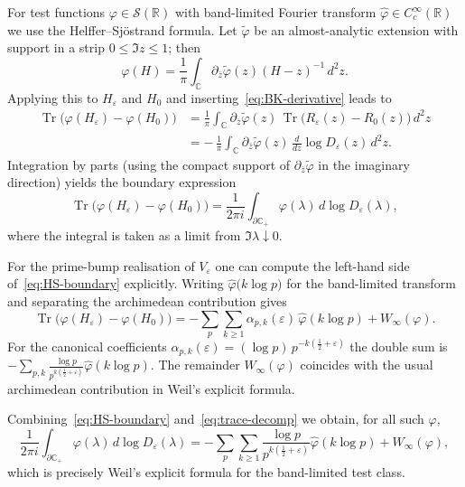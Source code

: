 ﻿\documentclass[12pt,a4paper]{article}
\theoremstyle{definition}
\theoremstyle{remark}
\newcommand{\CC}{\mathbb{C}}
\newcommand{\RR}{\mathbb{R}}
\newcommand{\Tr}{\operatorname{Tr}}
\begin{document}
For test functions $\varphi\in\mathcal{S}(\RR)$ with band-limited Fourier transform $\widehat\varphi\in C_c^\infty(\RR)$ we use the Helffer--Sj\"ostrand formula.  Let $\tilde{\varphi}$ be an almost-analytic extension with support in a strip $0\le\Im z\le1$; then
\begin{equation}
  \varphi(H)=\frac{1}{\pi}\int_{\CC}\partial_{\bar z}\tilde{\varphi}(z)
  (H-z)^{-1}
  \,d^2z.
  \label{eq:HS-formula}
\end{equation}
Applying this to $H_\varepsilon$ and $H_0$ and inserting~\eqref{eq:BK-derivative} leads to
\begin{align}
  \Tr\bigl(\varphi(H_\varepsilon)-\varphi(H_0)\bigr)
  &= \frac{1}{\pi}\int_{\CC} \partial_{\bar z}\tilde{\varphi}(z) \, \Tr\bigl(R_\varepsilon(z)-R_0(z)\bigr)\,d^2z \\[.5em]
  &=-\,\frac{1}{\pi}\int_{\CC} \partial_{\bar z}\tilde{\varphi}(z) \, \frac{d}{dz}\log D_\varepsilon(z)\,d^2z.
  \label{eq:HS-trace}
\end{align}
Integration by parts (using the compact support of $\partial_{\bar z}\tilde{\varphi}$ in the imaginary direction) yields the boundary expression
\begin{equation}
  \Tr\bigl(\varphi(H_\varepsilon)-\varphi(H_0)\bigr)
  = \frac{1}{2\pi i} \int_{\partial\CC_+} \varphi(\lambda)\, d\log D_\varepsilon(\lambda),
  \label{eq:HS-boundary}
\end{equation}
where the integral is taken as a limit from $\Im \lambda\downarrow0$.

For the prime-bump realisation of $V_\varepsilon$ one can compute the left-hand side of~\eqref{eq:HS-boundary} explicitly.  Writing $\widehat\varphi\bigl(k\log p\bigr)$ for the band-limited transform and separating the archimedean contribution gives
\begin{equation}
  \Tr\bigl(\varphi(H_\varepsilon)-\varphi(H_0)\bigr)
  = -\sum_{p}\sum_{k\ge1}\alpha_{p,k}(\varepsilon)\,\widehat\varphi(k\log p) + W_\infty(\varphi).
  \label{eq:trace-decomp}
\end{equation}
For the canonical coefficients $\alpha_{p,k}(\varepsilon)=(\log p)\,p^{-k(\frac12+\varepsilon)}$ the double sum is
\(
  -\sum_{p, k}\frac{\log p}{p^{k(\frac12+\varepsilon)}}\widehat\varphi(k\log p).
\)
The remainder $W_\infty(\varphi)$ coincides with the usual archimedean contribution in Weil's explicit formula.

Combining~\eqref{eq:HS-boundary} and~\eqref{eq:trace-decomp} we obtain, for all such $\varphi$,
\begin{equation}
  \frac{1}{2\pi i}\int_{\partial\CC_+} \varphi(\lambda)\, d\log D_\varepsilon(\lambda)
  = -\sum_{p}\sum_{k\ge1}\frac{\log p}{p^{k(\frac12+\varepsilon)}}\widehat\varphi(k\log p) + W_\infty(\varphi),
  \label{eq:explicit-formula}
\end{equation}
which is precisely Weil's explicit formula for the band-limited test class.
\end{document}
